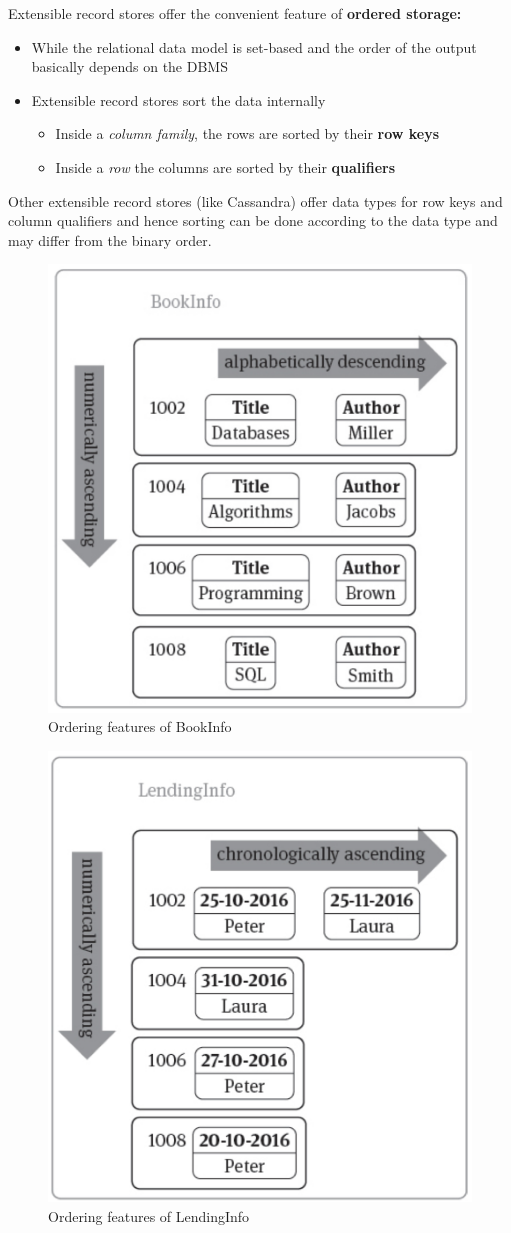 Extensible record stores offer the convenient feature of \textbf{ordered storage:}
\begin{itemize}
    \item While the relational data model is set-based and the order of the output basically depends on the DBMS
    \item Extensible record stores sort the data internally
    \begin{itemize}
        \item Inside a \textit{column family}, the rows are sorted by their \textbf{row keys}
        \item Inside a \textit{row} the columns are sorted by their \textbf{qualifiers}
    \end{itemize}
\end{itemize}

Other extensible record stores (like Cassandra) offer data types for row keys and column qualifiers and hence sorting can be done according to the data type and may differ from the binary order.

\begin{figure}[!hbp]
    \centering
    \includegraphics[width=0.50\linewidth]{images/AdvancedDataManagment/extensible_record_store/BookInfo.jpeg}
    \caption{Ordering features of BookInfo}
\end{figure}

\begin{figure}[!hbp]
    \centering
    \includegraphics[width=0.50\linewidth]{images/AdvancedDataManagment/extensible_record_store/LendingInfo.jpeg}
    \caption{Ordering features of LendingInfo}
\end{figure}

